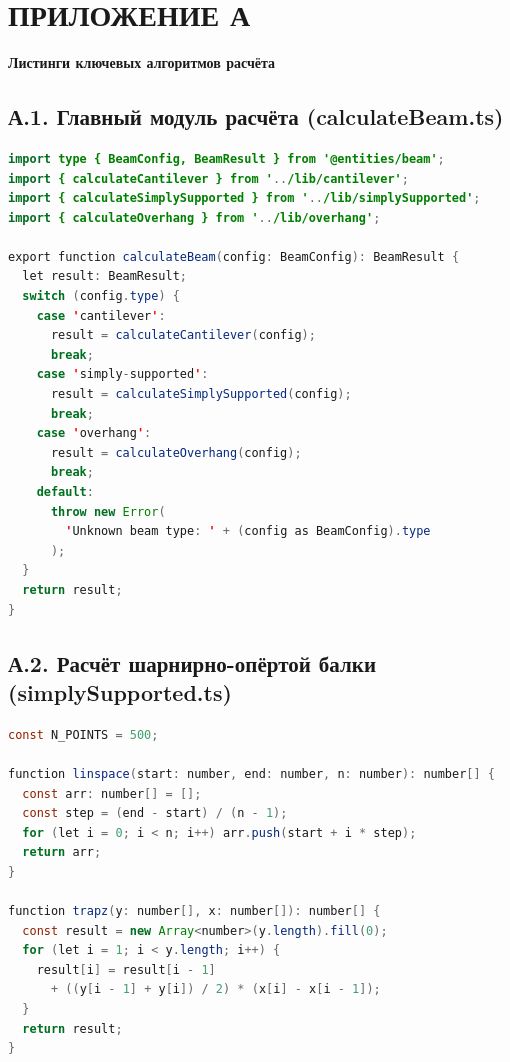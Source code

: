 ﻿%
\newpage
\section*{ПРИЛОЖЕНИЕ А}
\begin{center}
  \textbf{Листинги ключевых алгоритмов расчёта}
\end{center}

\subsection*{А.1. Главный модуль расчёта (calculateBeam.ts)}

\begin{lstlisting}[language=Java,caption={Диспетчер расчёта балки}]
import type { BeamConfig, BeamResult } from '@entities/beam';
import { calculateCantilever } from '../lib/cantilever';
import { calculateSimplySupported } from '../lib/simplySupported';
import { calculateOverhang } from '../lib/overhang';

export function calculateBeam(config: BeamConfig): BeamResult {
  let result: BeamResult;
  switch (config.type) {
    case 'cantilever':
      result = calculateCantilever(config);
      break;
    case 'simply-supported':
      result = calculateSimplySupported(config);
      break;
    case 'overhang':
      result = calculateOverhang(config);
      break;
    default:
      throw new Error(
        'Unknown beam type: ' + (config as BeamConfig).type
      );
  }
  return result;
}
\end{lstlisting}

\subsection*{А.2. Расчёт шарнирно-опёртой балки (simplySupported.ts)}

\begin{lstlisting}[language=Java,caption={Вспомогательные функции дискретизации и интегрирования}]
const N_POINTS = 500;

function linspace(start: number, end: number, n: number): number[] {
  const arr: number[] = [];
  const step = (end - start) / (n - 1);
  for (let i = 0; i < n; i++) arr.push(start + i * step);
  return arr;
}

function trapz(y: number[], x: number[]): number[] {
  const result = new Array<number>(y.length).fill(0);
  for (let i = 1; i < y.length; i++) {
    result[i] = result[i - 1]
      + ((y[i - 1] + y[i]) / 2) * (x[i] - x[i - 1]);
  }
  return result;
}
\end{lstlisting}

